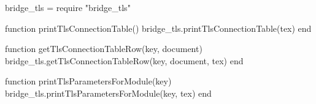 \begin{luacode}

  bridge_tls = require "bridge_tls"

  function printTlsConnectionTable()
    bridge_tls.printTlsConnectionTable(tex)
  end

  function getTlsConnectionTableRow(key, document)
    bridge_tls.getTlsConnectionTableRow(key, document, tex)
  end

  function printTlsParametersForModule(key)
    bridge_tls.printTlsParametersForModule(key, tex)
  end

\end{luacode}
